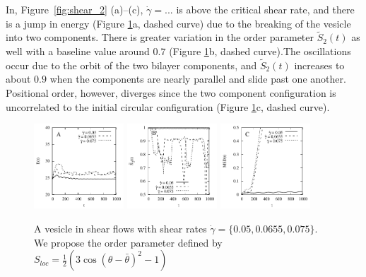 \documentclass[aps,prl,preprint,groupedaddress]{revtex4-2}
\begin{document}
In, Figure~\ref{fig:shear_2} (a)--(c), 
$\dot\gamma= ...$ is above the critical shear rate,
and there is a jump in energy (Figure \ref{fig:BC1_shear}a, dashed curve)
due to the breaking of the vesicle into two components.  
There is greater variation in the order parameter $\tilde{S}_2(t)$ as well
with a baseline value around $0.7$
(Figure \ref{fig:BC1_shear}b, dashed curve).The oscillations occur due to the
orbit of the two bilayer components, and $\tilde{S}_2(t)$ increases
to about $0.9$ when the components are nearly parallel and slide past one another.
Positional order, however, diverges since the two component configuration
is uncorrelated to the initial circular configuration (Figure \ref{fig:BC1_shear}c, dashed curve).


\begin{figure}
  \begin{center}
  \includegraphics[width=0.3\textwidth]{VS_E.pdf}
   \includegraphics[width=0.3\textwidth]{VS_LOP.pdf}
    \includegraphics[width=0.3\textwidth]{VS_MSD.pdf}
  \end{center}
  \caption{
    \label{fig:BC1_shear}
    A vesicle in shear flows with shear rates $\dot\gamma=\{0.05, 0.0655, 0.075\}$. We propose the order parameter defined by $S_{loc} = \frac12(3\cos(\theta-\bar\theta)^2-1)$}
\end{figure}
\end{document}
